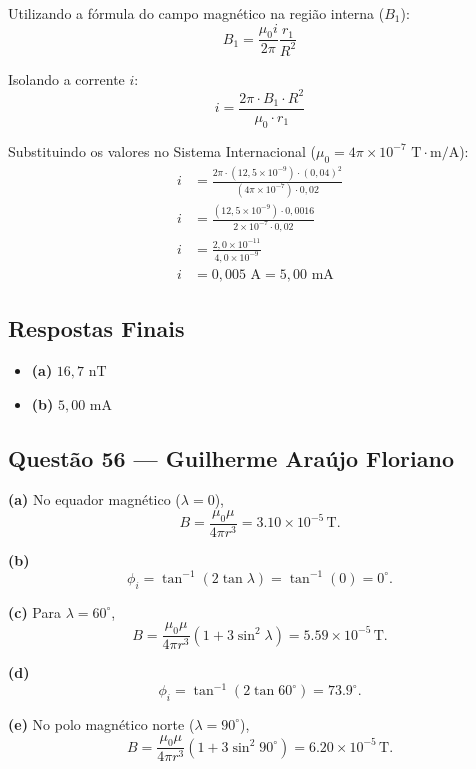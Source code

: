 \documentclass[12pt,a4paper]{article}
\begin{document}
Utilizando a fórmula do campo magnético na região interna ($B_1$):
\begin{equation*}
B_1 = \frac{\mu_0 i}{2\pi} \frac{r_1}{R^2}
\end{equation*}

Isolando a corrente $i$:
\begin{equation*}
i = \frac{2\pi \cdot B_1 \cdot R^2}{\mu_0 \cdot r_1}
\end{equation*}

Substituindo os valores no Sistema Internacional ($\mu_0 = 4\pi \times 10^{-7}\text{ T}\cdot\text{m/A}$):
\begin{align*}
i &= \frac{2\pi \cdot (12,5 \times 10^{-9}) \cdot (0,04)^2}{(4\pi \times 10^{-7}) \cdot 0,02} \\
i &= \frac{(12,5 \times 10^{-9}) \cdot 0,0016}{2 \times 10^{-7} \cdot 0,02} \\
i &= \frac{2,0 \times 10^{-11}}{4,0 \times 10^{-9}} \\
i &= 0,005\text{ A} = 5,00\text{ mA}
\end{align*}

\subsection*{Respostas Finais}
\begin{itemize}
    \item \textbf{(a)} $16,7\text{ nT}$
    \item \textbf{(b)} $5,00\text{ mA}$
\end{itemize}

\subsection{Questão 56 — Guilherme Araújo Floriano}

\textbf{(a)} No equador magnético ($\lambda=0$),
\[
B=\frac{\mu_0\mu}{4\pi r^3}=3.10\times10^{-5}\,\mathrm{T}.
\]

	\textbf{(b)}
\[
\phi_i=\tan^{-1}(2\tan\lambda)=\tan^{-1}(0)=0^\circ.
\]

	\textbf{(c)} Para $\lambda=60^\circ$,
\[
B=\frac{\mu_0\mu}{4\pi r^3}(1+3\sin^2\lambda)=5.59\times10^{-5}\,\mathrm{T}.
\]

	\textbf{(d)}
\[
\phi_i=\tan^{-1}(2\tan 60^\circ)=73.9^\circ.
\]

	\textbf{(e)} No polo magnético norte ($\lambda=90^\circ$),
\[
B=\frac{\mu_0\mu}{4\pi r^3}(1+3\sin^2 90^\circ)=6.20\times10^{-5}\,\mathrm{T}.
\]
\end{document}
